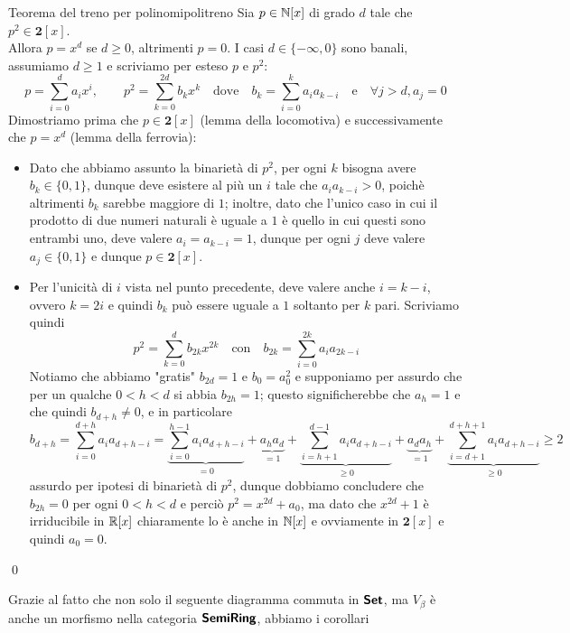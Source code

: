 \documentclass{article}
\begin{document}
\begin{theorem}{Teorema del treno per polinomi}{politreno}
    Sia $p \in \mathbb{N}[x]$ di grado $d$ tale che $p^2 \in \mathbf{2}[x]$.\\
    Allora $p = x^d$ se $d\ge 0$, altrimenti $p=0$.
    \proof 
    I casi $d\in\{-\infty, 0\}$ sono banali, assumiamo $d\ge 1$ e scriviamo per esteso $p$ e $p^2$:
    \[p = \sum_{i=0}^d a_i x^i, \qquad p^2 = \sum_{k=0}^{2d} b_k x^k \quad\text{dove}\quad b_k = \sum_{i=0}^k a_i a_{k-i} \quad\text{e}\quad \forall j > d, a_j=0\]
    Dimostriamo prima che $p \in \mathbf{2}[x]$ (lemma della locomotiva) e successivamente che $p = x^d$ (lemma della ferrovia):\begin{itemize}
        \item Dato che abbiamo assunto la binarietà di $p^2$, per ogni $k$ bisogna avere $b_k \in\{0,1\}$, dunque deve esistere al più un $i$ tale che $a_i a_{k-i} > 0$, poichè altrimenti $b_k$ sarebbe maggiore di $1$; inoltre, dato che l'unico caso in cui il prodotto di due numeri naturali è uguale a $1$ è quello in cui questi sono entrambi uno, deve valere $a_i = a_{k-i} = 1$, dunque per ogni $j$ deve valere $a_j \in \{0,1\}$ e dunque $p \in \mathbf{2}[x]$.
        \item Per l'unicità di $i$ vista nel punto precedente, deve valere anche $i = k-i$, ovvero $k = 2i$ e quindi $b_k$ può essere uguale a $1$ soltanto per $k$ pari. Scriviamo quindi
        \[ p^2 = \sum_{k=0}^d b_{2k} x^{2k} \quad \text{con}\quad b_{2k} = \sum_{i=0}^{2k}a_{i}a_{2k-i} \]
        Notiamo che abbiamo "gratis" $b_{2d} = 1$ e $b_0 = a_0^2$ e supponiamo per assurdo che per un qualche $0<h<d$ si abbia $b_{2h}=1$; questo significherebbe che $a_{h}=1$ e che quindi $b_{d+h}\neq 0$, e in particolare
        \[ b_{d+h} = \sum_{i=0}^{d+h} a_i a_{d+h-i} = \underbrace{\sum_{i=0}^{h-1} a_ia_{d+h-i}}_{=0} + \underbrace{a_{h}a_{d}}_{=1} + \underbrace{\sum_{i = h+1}^{d-1} a_{i} a_{d+h-i} }_{\ge 0} + \underbrace{a_{d}a_{h}}_{=1} + \underbrace{\sum_{i=d+1}^{d+h+1}a_i a_{d+h-i}}_{\ge 0}\ge 2\]
        assurdo per ipotesi di binarietà di $p^2$, dunque dobbiamo concludere che $b_{2h} = 0$ per ogni $0<h<d$ e perciò $p^2 = x^{2d} + a_0$, ma dato che $x^{2d} +1$ è irriducibile in $\mathbb{R}[x]$ chiaramente lo è anche in $\mathbb{N}[x]$ e ovviamente in $\mathbf{2}[x]$ e quindi $a_0 = 0$.
    \end{itemize}
    \qed
\end{theorem}

Grazie al fatto che non solo il seguente diagramma commuta in $\text{\sffamily\textbf{Set}}$, ma $V_\beta$ è anche un morfismo nella categoria $\text{\sffamily\textbf{SemiRing}}$, abbiamo i corollari
\end{document}
